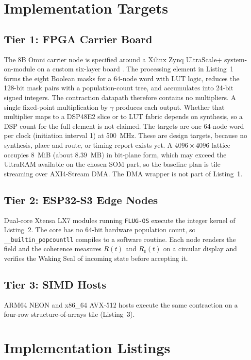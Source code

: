 \documentclass[10pt, twocolumn, a4paper]{article}
\begin{document}
\section{Implementation Targets}

\subsection{Tier 1: FPGA Carrier Board}
The 8B Omni carrier node is specified around a Xilinx Zynq UltraScale+ system-on-module on a custom six-layer board \cite{lodri2026omni}. The processing element in Listing~1 forms the eight Boolean masks for a 64-node word with LUT logic, reduces the 128-bit mask pairs with a population-count tree, and accumulates into 24-bit signed integers. The contraction datapath therefore contains no multipliers. A single fixed-point multiplication by $\gamma$ produces each output. Whether that multiplier maps to a DSP48E2 slice or to LUT fabric depends on synthesis, so a DSP count for the full element is not claimed. The targets are one 64-node word per clock (initiation interval 1) at 500~MHz. These are design targets, because no synthesis, place-and-route, or timing report exists yet. A $4096\times4096$ lattice occupies 8~MiB (about 8.39~MB) in bit-plane form, which may exceed the UltraRAM available on the chosen SOM part, so the baseline plan is tile streaming over AXI4-Stream DMA. The DMA wrapper is not part of Listing~1.

\subsection{Tier 2: ESP32-S3 Edge Nodes}
Dual-core Xtensa LX7 modules running \texttt{FLUG-OS} execute the integer kernel of Listing~2. The core has no 64-bit hardware population count, so \texttt{\_\_builtin\_popcountll} compiles to a software routine. Each node renders the field and the coherence measures $R(t)$ and $R_0(t)$ on a circular display and verifies the Waking Seal of incoming state before accepting it.

\subsection{Tier 3: SIMD Hosts}
ARM64 NEON and x86\_64 AVX-512 hosts execute the same contraction on a four-row structure-of-arrays tile (Listing~3).

\section{Implementation Listings}
\end{document}

